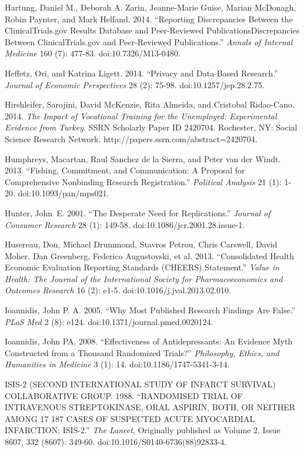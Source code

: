 \documentclass[12pt] {article}
\begin{document}
Hartung, Daniel M., Deborah A. Zarin, Jeanne-Marie Guise, Marian
McDonagh, Robin Paynter, and Mark Helfand. 2014. ``Reporting
Discrepancies Between the ClinicalTrials.gov Results Database and
Peer-Reviewed PublicationsDiscrepancies Between ClinicalTrials.gov and
Peer-Reviewed Publications.'' \emph{Annals of Internal Medicine} 160
(7): 477-83. doi:10.7326/M13-0480.

Heffetz, Ori, and Katrina Ligett. 2014. ``Privacy and Data-Based
Research.'' \emph{Journal of Economic Perspectives} 28 (2): 75-98.
doi:10.1257/jep.28.2.75.

Hirshleifer, Sarojini, David McKenzie, Rita Almeida, and Cristobal
Ridao-Cano. 2014. \emph{The Impact of Vocational Training for the
Unemployed: Experimental Evidence from Turkey}. SSRN Scholarly Paper ID
2420704. Rochester, NY: Social Science Research Network.
http://papers.ssrn.com/abstract=2420704.

Humphreys, Macartan, Raul Sanchez de la Sierra, and Peter van der Windt.
2013. ``Fishing, Commitment, and Communication: A Proposal for
Comprehensive Nonbinding Research Registration.'' \emph{Political
Analysis} 21 (1): 1-20. doi:10.1093/pan/mps021.

Hunter, John~E. 2001. ``The Desperate Need for Replications.''
\emph{Journal of Consumer Research} 28 (1): 149-58.
doi:10.1086/jcr.2001.28.issue-1.

Husereau, Don, Michael Drummond, Stavros Petrou, Chris Carswell, David
Moher, Dan Greenberg, Federico Augustovski, et al. 2013. ``Consolidated
Health Economic Evaluation Reporting Standards (CHEERS) Statement.''
\emph{Value in Health: The Journal of the International Society for
Pharmacoeconomics and Outcomes Research} 16 (2): e1-5.
doi:10.1016/j.jval.2013.02.010.

Ioannidis, John P. A. 2005. ``Why Most Published Research Findings Are
False.'' \emph{PLoS Med} 2 (8): e124. doi:10.1371/journal.pmed.0020124.

Ioannidis, John PA. 2008. ``Effectiveness of Antidepressants: An
Evidence Myth Constructed from a Thousand Randomized Trials?''
\emph{Philosophy, Ethics, and Humanities in Medicine} 3 (1): 14.
doi:10.1186/1747-5341-3-14.

ISIS-2 (SECOND INTERNATIONAL STUDY OF INFARCT SURVIVAL) COLLABORATIVE
GROUP. 1988. ``RANDOMISED TRIAL OF INTRAVENOUS STREPTOKINASE, ORAL
ASPIRIN, BOTH, OR NEITHER AMONG 17 187 CASES OF SUSPECTED ACUTE
MYOCARDIAL INFARCTION: ISIS-2.'' \emph{The Lancet}, Originally published
as Volume 2, Issue 8607, 332 (8607): 349-60.
doi:10.1016/S0140-6736(88)92833-4.
\end{document}
